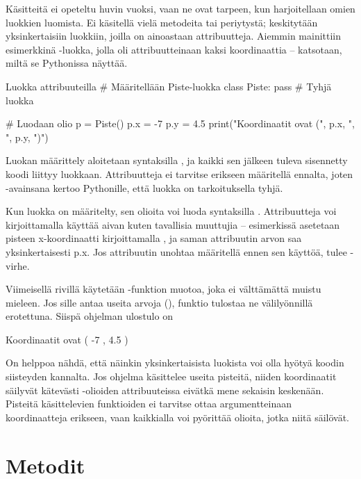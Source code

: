 Käsitteitä ei opeteltu huvin vuoksi, vaan ne ovat tarpeen, kun harjoitellaan omien luokkien luomista. Ei käsitellä vielä metodeita tai periytystä; keskitytään yksinkertaisiin luokkiin, joilla on ainoastaan attribuutteja. Aiemmin mainittiin esimerkkinä -luokka, jolla oli attribuutteinaan kaksi koordinaattia -- katsotaan, miltä se Pythonissa näyttää.

\begin{example}{Luokka attribuuteilla}
# Määritellään Piste-luokka
class Piste:
	pass # Tyhjä luokka

# Luodaan olio
p = Piste()
p.x = -7
p.y = 4.5
print("Koordinaatit ovat (", p.x, ", ", p.y, ")")
\end{example}

Luokan määrittely aloitetaan syntaksilla , ja kaikki sen jälkeen tuleva sisennetty koodi liittyy luokkaan. Attribuutteja ei tarvitse erikseen määritellä ennalta, joten -avainsana kertoo Pythonille, että luokka on tarkoituksella tyhjä.

Kun luokka on määritelty, sen olioita voi luoda syntaksilla . Attribuutteja voi kirjoittamalla  käyttää aivan kuten tavallisia muuttujia -- esimerkissä asetetaan pisteen x-koordinaatti kirjoittamalla , ja saman attribuutin arvon saa yksinkertaisesti {p.x}. Jos attribuutin unohtaa määritellä ennen sen käyttöä, tulee -virhe.

Viimeisellä rivillä käytetään -funktion muotoa, joka ei välttämättä muistu mieleen. Jos sille antaa useita arvoja (), funktio tulostaa ne välilyönnillä erotettuna. Siispä ohjelman ulostulo on

\begin{output}
Koordinaatit ovat ( -7 , 4.5 )
\end{output}

On helppoa nähdä, että näinkin yksinkertaisista luokista voi olla hyötyä koodin siisteyden kannalta. Jos ohjelma käsittelee useita pisteitä, niiden koordinaatit säilyvät kätevästi -olioiden attribuuteissa eivätkä mene sekaisin keskenään. Pisteitä käsittelevien funktioiden ei tarvitse ottaa argumentteinaan koordinaatteja erikseen, vaan kaikkialla voi pyörittää olioita, jotka niitä säilövät.

\section{Metodit}

